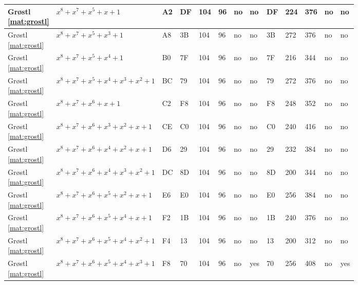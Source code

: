 \begin{tiny}
\begin{longtable}{|l|l|l|l|l|l|l|l|l|l|l|l|l|}
\shortstack{Gr{\o}stl \\ \eqref{mat:grostl}} & $x^8 + x^7 + x^5 + x + 1$ & A2 & DF & 104 & 96 & no & no & DF & 224 & 376 & no & no \\ \hline
\shortstack{Gr{\o}stl \\ \eqref{mat:grostl}} & $x^8 + x^7 + x^5 + x^3 + 1$ & A8 & 3B & 104 & 96 & no & no & 3B & 272 & 376 & no & no \\ \hline
\shortstack{Gr{\o}stl \\ \eqref{mat:grostl}} & $x^8 + x^7 + x^5 + x^4 + 1$ & B0 & 7F & 104 & 96 & no & no & 7F & 216 & 344 & no & no \\ \hline
\shortstack{Gr{\o}stl \\ \eqref{mat:grostl}} & $x^8 + x^7 + x^5 + x^4 + x^3 + x^2 + 1$ & BC & 79 & 104 & 96 & no & no & 79 & 272 & 376 & no & no \\ \hline
\shortstack{Gr{\o}stl \\ \eqref{mat:grostl}} & $x^8 + x^7 + x^6 + x + 1$ & C2 & F8 & 104 & 96 & no & no & F8 & 248 & 352 & no & no \\ \hline
\shortstack{Gr{\o}stl \\ \eqref{mat:grostl}} & $x^8 + x^7 + x^6 + x^3 + x^2 + x + 1$ & CE & C0 & 104 & 96 & no & no & C0 & 240 & 416 & no & no \\ \hline
\shortstack{Gr{\o}stl \\ \eqref{mat:grostl}} & $x^8 + x^7 + x^6 + x^4 + x^2 + x + 1$ & D6 & 29 & 104 & 96 & no & no & 29 & 232 & 384 & no & no \\ \hline
\shortstack{Gr{\o}stl \\ \eqref{mat:grostl}} & $x^8 + x^7 + x^6 + x^4 + x^3 + x^2 + 1$ & DC & 8D & 104 & 96 & no & no & 8D & 200 & 344 & no & no \\ \hline
\shortstack{Gr{\o}stl \\ \eqref{mat:grostl}} & $x^8 + x^7 + x^6 + x^5 + x^2 + x + 1$ & E6 & E0 & 104 & 96 & no & no & E0 & 256 & 384 & no & no \\ \hline
\shortstack{Gr{\o}stl \\ \eqref{mat:grostl}} & $x^8 + x^7 + x^6 + x^5 + x^4 + x + 1$ & F2 & 1B & 104 & 96 & no & no & 1B & 240 & 376 & no & no \\ \hline
\shortstack{Gr{\o}stl \\ \eqref{mat:grostl}} & $x^8 + x^7 + x^6 + x^5 + x^4 + x^2 + 1$ & F4 & 13 & 104 & 96 & no & no & 13 & 200 & 312 & no & no \\ \hline
\shortstack{Gr{\o}stl \\ \eqref{mat:grostl}} & $x^8 + x^7 + x^6 + x^5 + x^4 + x^3 + 1$ & F8 & 70 & 104 & 96 & no & yes & 70 & 256 & 408 & no & yes \\ \hline

\end{longtable}
\end{tiny}
